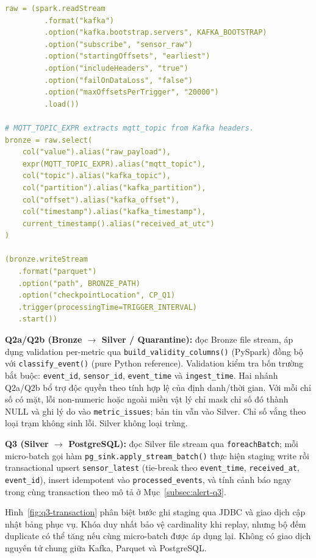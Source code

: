 \begin{lstlisting}[language=yaml,basicstyle=\ttfamily\footnotesize,frame=single,
  caption={Pseudo-code Q1: Kafka to Bronze.},label={lst:q1}]
raw = (spark.readStream
         .format("kafka")
         .option("kafka.bootstrap.servers", KAFKA_BOOTSTRAP)
         .option("subscribe", "sensor_raw")
         .option("startingOffsets", "earliest")
         .option("includeHeaders", "true")
         .option("failOnDataLoss", "false")
         .option("maxOffsetsPerTrigger", "20000")
         .load())

# MQTT_TOPIC_EXPR extracts mqtt_topic from Kafka headers.
bronze = raw.select(
    col("value").alias("raw_payload"),
    expr(MQTT_TOPIC_EXPR).alias("mqtt_topic"),
    col("topic").alias("kafka_topic"),
    col("partition").alias("kafka_partition"),
    col("offset").alias("kafka_offset"),
    col("timestamp").alias("kafka_timestamp"),
    current_timestamp().alias("received_at_utc")
)

(bronze.writeStream
   .format("parquet")
   .option("path", BRONZE_PATH)
   .option("checkpointLocation", CP_Q1)
   .trigger(processingTime=TRIGGER_INTERVAL)
   .start())
\end{lstlisting}

\textbf{Q2a/Q2b (Bronze $\rightarrow$ Silver / Quarantine):} đọc Bronze file
stream, áp dụng validation per-metric qua \texttt{build\_validity\_columns()}
(PySpark) đồng bộ với \texttt{classify\_event()} (pure Python reference).
Validation kiểm tra bốn trường bắt buộc: \texttt{event\_id},
\texttt{sensor\_id}, \texttt{event\_time} và \texttt{ingest\_time}. Hai nhánh
Q2a/Q2b bổ trợ độc quyền theo tính hợp lệ của định danh/thời gian. Với mỗi
chỉ số có mặt, lỗi non-numeric hoặc ngoài miền vật lý chỉ mask chỉ số đó
thành NULL và ghi lý do vào \texttt{metric\_issues}; bản tin vẫn vào Silver.
Chỉ số vắng theo loại trạm không sinh lỗi. Silver không loại trùng.

\textbf{Q3 (Silver $\rightarrow$ PostgreSQL):} đọc Silver file stream qua
\texttt{foreachBatch}; mỗi micro-batch gọi hàm
\texttt{pg\_sink.apply\_stream\_batch()} thực hiện staging write rồi
transactional upsert \texttt{sensor\_latest} (tie-break theo
\texttt{event\_time}, \texttt{received\_at}, \texttt{event\_id}), insert
idempotent vào \texttt{processed\_events}, và tính cảnh báo ngay trong cùng
transaction theo mô tả ở Mục~\ref{subsec:alert-q3}.

Hình~\ref{fig:q3-transaction} phân biệt bước ghi staging qua JDBC và giao
dịch cập nhật bảng phục vụ. Khóa duy nhất bảo vệ cardinality khi replay,
nhưng bộ đếm duplicate có thể tăng nếu cùng micro-batch được áp dụng lại.
Không có giao dịch nguyên tử chung giữa Kafka, Parquet và PostgreSQL.

